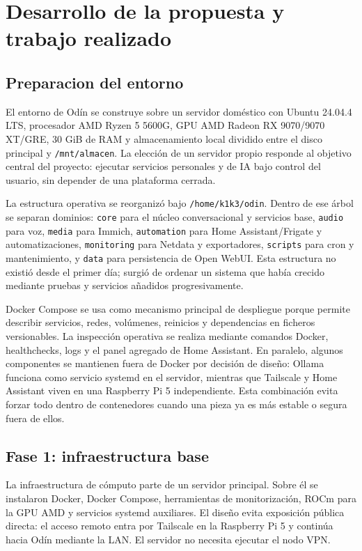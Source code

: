 \chapter{Desarrollo de la propuesta y trabajo realizado}

\section{Preparacion del entorno}
El entorno de Odín se construye sobre un servidor doméstico con Ubuntu 24.04.4 LTS, procesador AMD Ryzen 5 5600G, GPU AMD Radeon RX 9070/9070 XT/GRE, 30 GiB de RAM y almacenamiento local dividido entre el disco principal y \nolinkurl{/mnt/almacen}. La elección de un servidor propio responde al objetivo central del proyecto: ejecutar servicios personales y de IA bajo control del usuario, sin depender de una plataforma cerrada.

La estructura operativa se reorganizó bajo \nolinkurl{/home/k1k3/odin}. Dentro de ese árbol se separan dominios: \texttt{core} para el núcleo conversacional y servicios base, \texttt{audio} para voz, \texttt{media} para Immich, \texttt{automation} para Home Assistant/Frigate y automatizaciones, \texttt{monitoring} para Netdata y exportadores, \texttt{scripts} para cron y mantenimiento, y \texttt{data} para persistencia de Open WebUI. Esta estructura no existió desde el primer día; surgió de ordenar un sistema que había crecido mediante pruebas y servicios añadidos progresivamente.

Docker Compose se usa como mecanismo principal de despliegue porque permite describir servicios, redes, volúmenes, reinicios y dependencias en ficheros versionables. La inspección operativa se realiza mediante comandos Docker, healthchecks, logs y el panel agregado de Home Assistant. En paralelo, algunos componentes se mantienen fuera de Docker por decisión de diseño: Ollama funciona como servicio systemd en el servidor, mientras que Tailscale y Home Assistant viven en una Raspberry Pi 5 independiente. Esta combinación evita forzar todo dentro de contenedores cuando una pieza ya es más estable o segura fuera de ellos.

\section{Fase 1: infraestructura base}
La infraestructura de cómputo parte de un servidor principal. Sobre él se instalaron Docker, Docker Compose, herramientas de monitorización, ROCm para la GPU AMD y servicios systemd auxiliares. El diseño evita exposición pública directa: el acceso remoto entra por Tailscale en la Raspberry Pi 5 y continúa hacia Odín mediante la LAN. El servidor no necesita ejecutar el nodo VPN.

